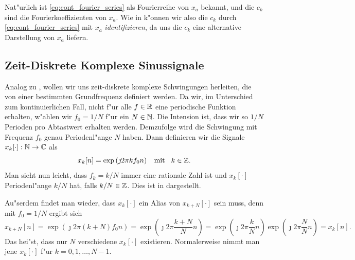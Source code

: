 Nat"urlich ist \eqref{eq:cont_fourier_series} als Fourierreihe von $x_a$ bekannt, und die $c_k$ sind die Fourierkoeffizienten von $x_a$.
Wie in  k"onnen wir also die $c_k$ durch \eqref{eq:cont_fourier_series} mit $x_a$ \emph{identifizieren}, da uns die $c_k$ eine alternative Darstellung von $x_a$ liefern.
%
\subsection{Zeit-Diskrete Komplexe Sinussignale}
%
Analog zu , wollen wir uns zeit-diskrete komplexe Schwingungen herleiten, die von einer bestimmten Grundfrequenz definiert werden.
Da wir, im Unterschied zum kontinuierlichen Fall, nicht f"ur alle $f \in \mathbb{R}$ eine periodische Funktion erhalten, w"ahlen wir $f_0 = 1/N$ f"ur ein $N \in \mathbb{N}$. 
Die Intension ist, dass wir so $1/N$ Perioden pro Abtastwert erhalten werden. 
Demzufolge wird die Schwingung mit Frequenz $f_0$ genau Periodenl"ange $N$ haben.
Dann definieren wir die Signale $x_k[\cdot]: \mathbb{N} \rightarrow \mathbb{C}$ als
%
\begin{equation}\label{eq:disc_harms_comp}
    x_k[n] = \exp\left(
        \jmath 2 \pi k f_0 n
    \right) {\hspace{3mm} \text{mit} \hspace{3mm}} k \in \mathbb{Z}.
\end{equation}
%
Man sieht nun leicht, dass $f_k = k/N$ immer eine rationale Zahl ist und $x_k[\cdot]$ Periodenl"ange $k/N$ hat, falls $k/N \in \mathbb{Z}$.
Dies ist in  dargestellt.

Au"serdem findet man wieder, dass $x_k[\cdot]$ ein Alias von $x_{k+N}[\cdot]$ sein muss, denn mit $f_0 = 1/N$ ergibt sich
\[
 x_{k+N}[n] = \exp\left(
        \jmath 2 \pi (k + N) f_0 n
    \right)
    = \exp\left(
        \jmath 2 \pi \frac{k + N}{N} n
    \right)
    = \exp\left(
        \jmath 2 \pi \frac{k}{N} n
    \right) 
    \exp\left(
        \jmath 2 \pi \frac NN n
    \right) 
    = x_k[n].
\]
Das hei"st, dass nur $N$ verschiedene $x_k[\cdot]$ existieren.
Normalerweise nimmt man jene $x_k[\cdot]$ f"ur $k = 0, 1, \ldots, N-1$.

